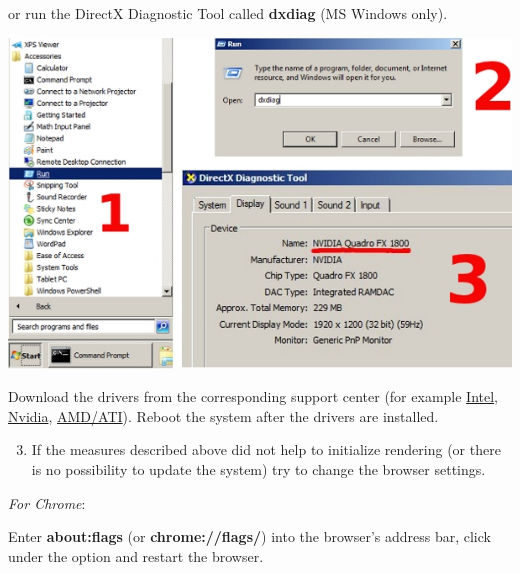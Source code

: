 \documentclass[a4paper,12pt,oneside]{sphinxmanual}
\begin{document}
\begin{DUlineblock}{0em}
\item[] 
\end{DUlineblock}

or run the DirectX Diagnostic Tool called \textbf{dxdiag} (MS Windows only).

\begin{DUlineblock}{0em}
\item[] 
\end{DUlineblock}

{\hfill\includegraphics[width=1.000\linewidth]{dxdiag.jpg}\hfill}

\begin{DUlineblock}{0em}
\item[] 
\end{DUlineblock}

Download the drivers from the corresponding support center (for example \href{http://downloadcenter.intel.com/Default.aspx}{Intel}, \href{http://www.nvidia.com/Download/index.aspx}{Nvidia}, \href{http://support.amd.com/en-us/download}{AMD/ATI}). Reboot the system after the drivers are installed.
\begin{enumerate}
\setcounter{enumi}{2}
\item {} 
If the measures described above did not help to initialize rendering (or there is no possibility to update the system) try to change the browser settings.

\end{enumerate}

\emph{For Chrome}:

Enter \textbf{about:flags} (or \textbf{chrome://flags/}) into the browser's address bar, click  under the  option and restart the browser.
\end{document}
